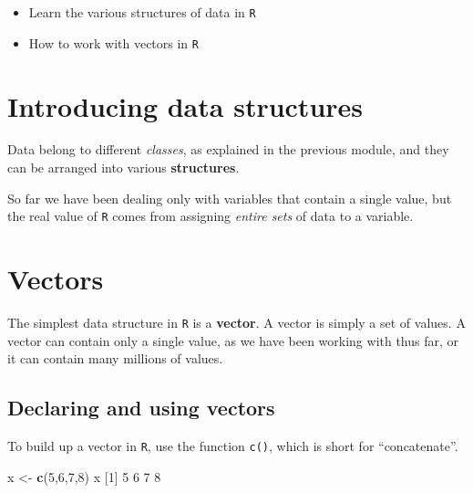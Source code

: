 \documentclass[
]{book}
\newenvironment{Shaded}{\begin{snugshade}}{\end{snugshade}}
\newcommand{\DecValTok}[1]{\textcolor[rgb]{0.00,0.00,0.81}{#1}}
\newcommand{\KeywordTok}[1]{\textcolor[rgb]{0.13,0.29,0.53}{\textbf{#1}}}
\newcommand{\NormalTok}[1]{#1}
\newcommand{\StringTok}[1]{\textcolor[rgb]{0.31,0.60,0.02}{#1}}
\providecommand{\tightlist}{%
  \setlength{\itemsep}{0pt}\setlength{\parskip}{0pt}}
\begin{document}
\begin{itemize}
\tightlist
\item
  Learn the various structures of data in \texttt{R}\\
\item
  How to work with vectors in \texttt{R}
\end{itemize}

\hypertarget{introducing-data-structures}{%
\section*{Introducing data structures}\label{introducing-data-structures}}

Data belong to different \emph{classes}, as explained in the previous module, and they can be arranged into various \textbf{structures}.

So far we have been dealing only with variables that contain a single value, but the real value of \texttt{R} comes from assigning \emph{entire sets} of data to a variable.

\hypertarget{vectors}{%
\section*{Vectors}\label{vectors}}

The simplest data structure in \texttt{R} is a \textbf{vector}. A vector is simply a set of values. A vector can contain only a single value, as we have been working with thus far, or it can contain many millions of values.

\hypertarget{declaring-and-using-vectors}{%
\subsection*{Declaring and using vectors}\label{declaring-and-using-vectors}}

To build up a vector in \texttt{R}, use the function \texttt{c()}, which is short for ``concatenate''.

\begin{Shaded}
\begin{Highlighting}[]
\NormalTok{x <-}\StringTok{ }\KeywordTok{c}\NormalTok{(}\DecValTok{5}\NormalTok{,}\DecValTok{6}\NormalTok{,}\DecValTok{7}\NormalTok{,}\DecValTok{8}\NormalTok{)}
\NormalTok{x}
\NormalTok{[}\DecValTok{1}\NormalTok{] }\DecValTok{5} \DecValTok{6} \DecValTok{7} \DecValTok{8}
\end{Highlighting}
\end{Shaded}
\end{document}
